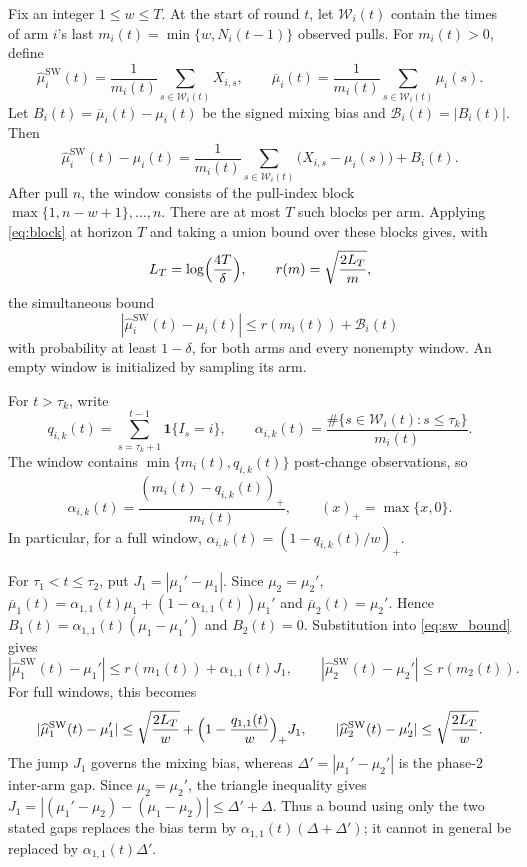 Fix an integer $1\le w\le T$. At the start of round $t$, let $\mathcal W_i(t)$ contain the times of arm $i$'s last $m_i(t)=\min\{w,N_i(t-1)\}$ observed pulls. For $m_i(t)>0$, define
\[
\widehat\mu_i^{\mathrm{SW}}(t)=\frac1{m_i(t)}\sum_{s\in\mathcal W_i(t)}X_{i,s},\qquad \overline\mu_i(t)=\frac1{m_i(t)}\sum_{s\in\mathcal W_i(t)}\mu_i(s).
\]
Let $B_i(t)=\overline\mu_i(t)-\mu_i(t)$ be the signed mixing bias and $\mathcal B_i(t)=|B_i(t)|$. Then
\begin{equation}\label{eq:decomp}
\widehat\mu_i^{\mathrm{SW}}(t)-\mu_i(t)=\frac1{m_i(t)}\sum_{s\in\mathcal W_i(t)}\bigl(X_{i,s}-\mu_i(s)\bigr)+B_i(t).
\end{equation}
After pull $n$, the window consists of the pull-index block $\max\{1,n-w+1\},\dots,n$. There are at most $T$ such blocks per arm. Applying \eqref{eq:block} at horizon $T$ and taking a union bound over these blocks gives, with
\[
L_T=\log\Bigl(\frac{4T}{\delta}\Bigr),\qquad r(m)=\sqrt{\frac{2L_T}{m}},
\]
the simultaneous bound
\begin{equation}\label{eq:sw_bound}
|\widehat\mu_i^{\mathrm{SW}}(t)-\mu_i(t)|\le r(m_i(t))+\mathcal B_i(t)
\end{equation}
with probability at least $1-\delta$, for both arms and every nonempty window. An empty window is initialized by sampling its arm.

For $t>\tau_k$, write
\[
q_{i,k}(t)=\sum_{s=\tau_k+1}^{t-1}\mathbf 1\{I_s=i\},\qquad \alpha_{i,k}(t)=\frac{\#\{s\in\mathcal W_i(t):s\le\tau_k\}}{m_i(t)}.
\]
The window contains $\min\{m_i(t),q_{i,k}(t)\}$ post-change observations, so
\begin{equation}\label{eq:alpha}
\alpha_{i,k}(t)=\frac{(m_i(t)-q_{i,k}(t))_+}{m_i(t)},\qquad (x)_+=\max\{x,0\}.
\end{equation}
In particular, for a full window, $\alpha_{i,k}(t)=(1-q_{i,k}(t)/w)_+$.

For $\tau_1<t\le\tau_2$, put $J_1=|\mu_1'-\mu_1|$. Since $\mu_2=\mu_2'$, $\overline\mu_1(t)=\alpha_{1,1}(t)\mu_1+(1-\alpha_{1,1}(t))\mu_1'$ and $\overline\mu_2(t)=\mu_2'$. Hence $B_1(t)=\alpha_{1,1}(t)(\mu_1-\mu_1')$ and $B_2(t)=0$. Substitution into \eqref{eq:sw_bound} gives
\begin{equation}\label{eq:phase2}
|\widehat\mu_1^{\mathrm{SW}}(t)-\mu_1'|\le r(m_1(t))+\alpha_{1,1}(t)J_1,\qquad |\widehat\mu_2^{\mathrm{SW}}(t)-\mu_2'|\le r(m_2(t)).
\end{equation}
For full windows, this becomes
\begin{equation}\label{eq:phase2_full}
|\widehat\mu_1^{\mathrm{SW}}(t)-\mu_1'|\le\sqrt{\frac{2L_T}{w}}+\Bigl(1-\frac{q_{1,1}(t)}{w}\Bigr)_+J_1,\qquad |\widehat\mu_2^{\mathrm{SW}}(t)-\mu_2'|\le\sqrt{\frac{2L_T}{w}}.
\end{equation}
The jump $J_1$ governs the mixing bias, whereas $\Delta'=|\mu_1'-\mu_2'|$ is the phase-2 inter-arm gap. Since $\mu_2=\mu_2'$, the triangle inequality gives $J_1=|(\mu_1'-\mu_2)-(\mu_1-\mu_2)|\le\Delta'+\Delta$. Thus a bound using only the two stated gaps replaces the bias term by $\alpha_{1,1}(t)(\Delta+\Delta')$; it cannot in general be replaced by $\alpha_{1,1}(t)\Delta'$.

